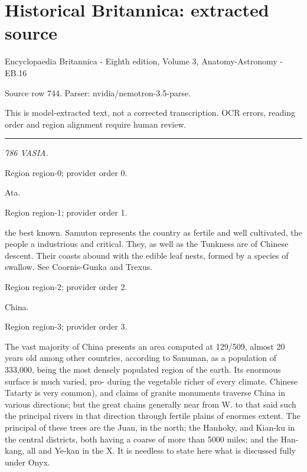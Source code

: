 \documentclass[11pt]{article}
\begin{document}
\section*{Historical Britannica: extracted source}
Encyclopaedia Britannica - Eighth edition, Volume 3, Anatomy-Astronomy - EB.16\par
{\small Source row 744. Parser: nvidia/nemotron-3.5-parse.\par}
{\small This is model-extracted text, not a corrected transcription. OCR errors, reading order and region alignment require human review.\par}
\hrule\medskip
{\small\itshape 786 VASIA.\par}

{\scriptsize\color{gray} Region region-0; provider order 0.\par}
\medskip

Ata.
\par

{\scriptsize\color{gray} Region region-1; provider order 1.\par}
\medskip

the best known. Samuton represents the country as fertile and well cultivated, the people a industrious and critical. They, as well as the Tunkness are of Chinese descent. Their coasts abound with the edible leaf nests, formed by a species of swallow. See Coornis-Gunka and Trexus.
\par

{\scriptsize\color{gray} Region region-2; provider order 2.\par}
\medskip

China.
\par

{\scriptsize\color{gray} Region region-3; provider order 3.\par}
\medskip

The vast majority of China presents an area computed at 129/509, almost 20 years old among other countries, according to Sanuman, as a population of 333,000, being the most densely populated region of the earth. Its enormous surface is much varied, pro- during the vegetable richer of every climate. Chinese Tatarty is very common), and claims of granite monuments traverse China in various directions; but the great chains generally near from W. to that said such the principal rivers in that direction through fertile plains of enormes extent. The principal of these trees are the Juan, in the north; the Hanhoky, and Kian-ku in the central districts, both having a coarse of more than 5000 miles; and the Han-kang, all and Ye-kan in the X. It is needless to state here what is discussed fully under Onyx.
\par
\end{document}
